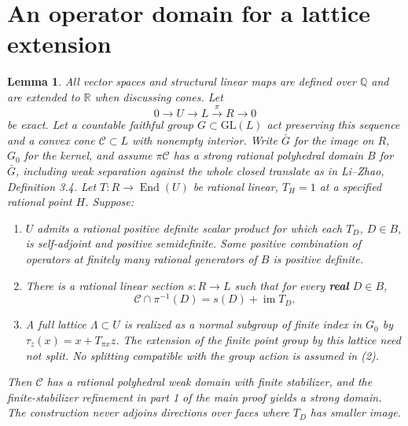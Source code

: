 \documentclass[11pt]{article}
\newtheorem{lemma}{Lemma}
\providecommand{\tightlist}{\setlength{\itemsep}{0pt}\setlength{\parskip}{0pt}}
\begin{document}
\appendix
\section{An operator domain for a lattice extension}\label{app:operator}
\begin{lemma}\label{lem:operator}
All vector spaces and structural linear maps are defined over \(\mathbb Q\) and are extended to \(\mathbb R\) when discussing cones. Let \[
0\longrightarrow U\longrightarrow L\xrightarrow{\pi} R\longrightarrow0
\] be exact. Let a countable faithful group \(G\subset\mathrm{GL}(L)\) act preserving this sequence and a convex cone \(\mathcal C\subset L\) with nonempty interior. Write \(\bar G\) for the image on \(R\), \(G_0\) for the kernel, and assume \(\pi\mathcal C\) has a strong rational polyhedral domain \(B\) for \(\bar G\), including weak separation against the whole closed translate as in Li--Zhao, Definition 3.4. Let \(T:R\to\operatorname{End}(U)\) be rational linear, \(T_H=1\) at a specified rational point \(H\). Suppose:

\begin{enumerate}
\def\labelenumi{\arabic{enumi}.}
\tightlist
\item
  \(U\) admits a rational positive definite scalar product for which each \(T_D\), \(D\in B\), is self-adjoint and positive semidefinite. Some positive combination of operators at finitely many rational generators of \(B\) is positive definite.
\item
  There is a rational linear section \(s:R\to L\) such that for every \textbf{real} \(D\in B\), \[
  \mathcal C\cap\pi^{-1}(D)=s(D)+\operatorname{im}T_D .
  \]
\item
  A full lattice \(\Lambda\subset U\) is realized as a normal subgroup of finite index in \(G_0\) by \(\tau_z(x)=x+T_{\pi x}z\). The extension of the finite point group by this lattice need not split. No splitting compatible with the group action is assumed in (2).
\end{enumerate}

Then \(\mathcal C\) has a rational polyhedral weak domain with finite stabilizer, and the finite-stabilizer refinement in part 1 of the main proof yields a strong domain. The construction never adjoins directions over faces where \(T_D\) has smaller image.

\end{lemma}
\end{document}
